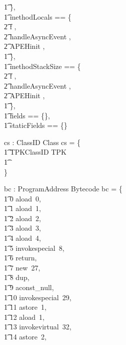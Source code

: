 \begin{figure}[p]
\begin{vwcol}[widths={0.7,0.3},rule=none]
\begin{axdef}
      \t1 \}, \\
      \t1 methodLocals == \{ \\
      \t2 f , \\
      \t2 handleAsyncEvent , \\
      \t2 APEHinit , \\
      \t1 \}, \\
      \t1 methodStackSize == \{ \\
      \t2 f , \\
      \t2 handleAsyncEvent , \\
      \t2 APEHinit , \\
      \t1 \}, \\
      \t1 fields == \{\}, \\
      \t1 staticFields == \{\} \\
      \rblot
    \end{axdef}
    \begin{axdef}
      cs : ClassID \pfun Class
      \where
      cs = \{ \\
      \t1 TPKClassID \mapsto TPK \\
      \t1 \cdots \\
      \}
    \end{axdef}
    \begin{axdef}
      bc : ProgramAddress \pfun Bytecode
      \where
      bc = \{ \\
      	\t1 0 \mapsto aload~0, \\
        \t1 1 \mapsto aload~1, \\
        \t1 2 \mapsto aload~2, \\
        \t1 3 \mapsto aload~3, \\
        \t1 4 \mapsto aload~4, \\
        \t1 5 \mapsto invokespecial~8, \\
        \t1 6 \mapsto return, \\
        \t1 7 \mapsto new~27, \\
        \t1 8 \mapsto dup, \\
        \t1 9 \mapsto aconst\_null, \\
        \t1 10 \mapsto invokespecial~29, \\
        \t1 11 \mapsto astore~1, \\
        \t1 12 \mapsto aload~1, \\
        \t1 13 \mapsto invokevirtual~32, \\
        \t1 14 \mapsto astore~2, \\

\end{axdef}
\end{vwcol}
\end{figure}
